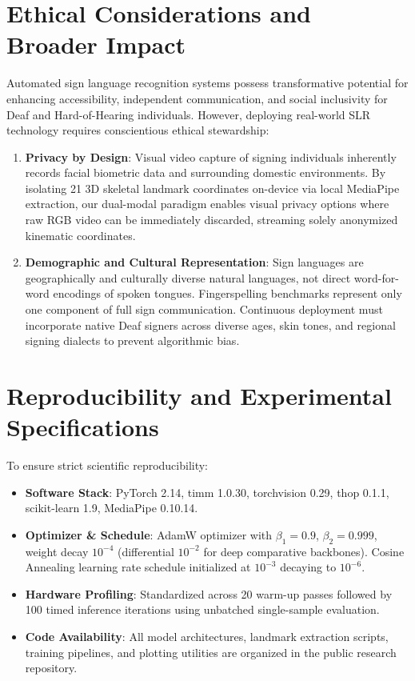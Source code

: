 \documentclass[journal]{IEEEtran}
\begin{document}
\section{Ethical Considerations and Broader Impact}
Automated sign language recognition systems possess transformative potential for enhancing accessibility, independent communication, and social inclusivity for Deaf and Hard-of-Hearing individuals. However, deploying real-world SLR technology requires conscientious ethical stewardship:
\begin{enumerate}
    \item \textbf{Privacy by Design}: Visual video capture of signing individuals inherently records facial biometric data and surrounding domestic environments. By isolating 21 3D skeletal landmark coordinates on-device via local MediaPipe extraction, our dual-modal paradigm enables visual privacy options where raw RGB video can be immediately discarded, streaming solely anonymized kinematic coordinates.
    \item \textbf{Demographic and Cultural Representation}: Sign languages are geographically and culturally diverse natural languages, not direct word-for-word encodings of spoken tongues. Fingerspelling benchmarks represent only one component of full sign communication. Continuous deployment must incorporate native Deaf signers across diverse ages, skin tones, and regional signing dialects to prevent algorithmic bias.
\end{enumerate}

\section{Reproducibility and Experimental Specifications}
To ensure strict scientific reproducibility:
\begin{itemize}
    \item \textbf{Software Stack}: PyTorch 2.14, timm 1.0.30, torchvision 0.29, thop 0.1.1, scikit-learn 1.9, MediaPipe 0.10.14.
    \item \textbf{Optimizer \& Schedule}: AdamW optimizer with $\beta_1 = 0.9$, $\beta_2 = 0.999$, weight decay $10^{-4}$ (differential $10^{-2}$ for deep comparative backbones). Cosine Annealing learning rate schedule initialized at $10^{-3}$ decaying to $10^{-6}$.
    \item \textbf{Hardware Profiling}: Standardized across 20 warm-up passes followed by 100 timed inference iterations using unbatched single-sample evaluation.
    \item \textbf{Code Availability}: All model architectures, landmark extraction scripts, training pipelines, and plotting utilities are organized in the public research repository.
\end{itemize}
\end{document}
